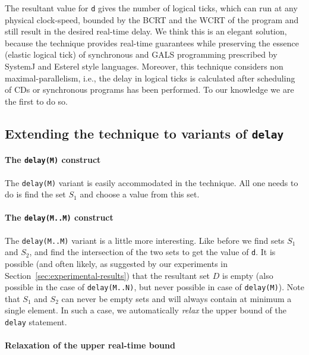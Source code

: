 The resultant value for \texttt{d} gives the number of logical ticks,
which can run at any physical clock-speed, bounded by the BCRT and the
WCRT of the program and still result in the desired real-time delay. We
think this is an elegant solution, because the technique provides
real-time guarantees while preserving the essence (elastic logical tick)
of synchronous and GALS programming prescribed by SystemJ and Esterel
style languages. Moreover, this technique considers non
maximal-parallelism, i.e., the delay in logical ticks is calculated
after scheduling of CDs or synchronous programs has been performed. To
our knowledge we are the first to do so.

\subsection{Extending the technique to variants of \texttt{delay}}
\label{sec:extend-tehcn-vari}

\paragraph{The \texttt{delay(M)} construct}
\label{sec:extend-techn-vari}

The \texttt{delay(M)} variant is easily accommodated in the
technique. All one needs to do is find the set $S_1$ and choose a value
from this set.

\paragraph{The \texttt{delay(M..M)} construct}
\label{sec:extend-techn-vari}

The \texttt{delay(M..M)} variant is a little more interesting. Like
before we find sets $S_1$ and $S_2$, and find the intersection of the
two sets to get the value of \texttt{d}. It is possible (and often
likely, as suggested by our experiments in
Section~\ref{sec:experimental-results}) that the resultant set $D$ is
empty (also possible in the case of \texttt{delay(M..N)}, but never
possible in case of \texttt{delay(M)}). Note that $S_1$ and $S_2$ can
never be empty sets and will always contain at minimum a single
element. In such a case, we automatically \textit{relax} the upper bound
of the \texttt{delay} statement.

\paragraph{Relaxation of the upper real-time bound}
\label{sec:over-appr-relax}

